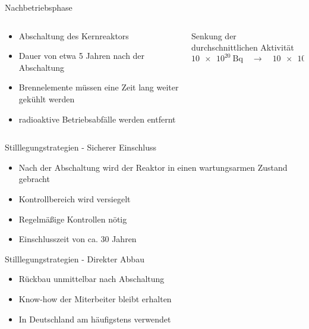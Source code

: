 \begin{frame}{ Nachbetriebsphase }
  \begin{columns}

    \begin{column}{0.48\textwidth}

        \begin{itemize}
          \setlength\itemsep{1.2em}
          \item{ Abschaltung des Kernreaktors }
          \item{ Dauer von etwa 5 Jahren nach der Abschaltung}
          \item{ Brennelemente müssen eine Zeit lang weiter gekühlt werden }
          \item{ radioaktive Betriebsabfälle werden entfernt }
        \end{itemize}

    \end{column}

    \begin{column}{0.48\textwidth}
      Senkung der durchschnittlichen Aktivität
      \begin{equation*}
        \SI{10e20}{\becquerel} \quad \rightarrow  \quad \SI{10e16}{\becquerel}
      \end{equation*}
    \end{column}

  \end{columns}
\end{frame}



\begin{frame}{Stilllegungstrategien - Sicherer Einschluss}
  \begin{itemize}
    \setlength\itemsep{1.2em}
    \item{ Nach der Abschaltung wird der Reaktor in einen wartungsarmen Zustand gebracht}
    \item{ Kontrollbereich wird versiegelt}
    \item{ Regelmäßige Kontrollen nötig}
    \item{ Einschlusszeit von ca. $30$ Jahren}
  \end{itemize}
\end{frame}



\begin{frame}{Stilllegungstrategien - Direkter Abbau}
   \begin{itemize}
    \setlength\itemsep{1.2em}
      \item{ Rückbau unmittelbar nach Abschaltung }
      \item{ Know-how der Miterbeiter bleibt erhalten}
      \item{ In Deutschland am häufigstens verwendet}
  \end{itemize}
\end{frame}



